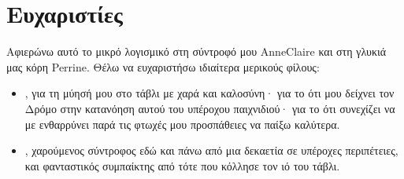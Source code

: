 \documentclass[letterpaper,10pt,greek]{sphinxmanual}
\begin{document}
\chapter{Ευχαριστίες}
\label{\detokenize{index:remerciements}}
\sphinxAtStartPar
Αφιερώνω αυτό το μικρό λογισμικό στη σύντροφό μου Anne\sphinxhyphen{}Claire και στη γλυκιά μας κόρη Perrine. Θέλω να ευχαριστήσω ιδιαίτερα μερικούς φίλους:
\begin{itemize}
\item {} 
\sphinxAtStartPar
{}, για τη μύησή μου στο τάβλι με χαρά και καλοσύνη· για το ότι μου δείχνει τον Δρόμο στην κατανόηση αυτού του υπέροχου παιχνιδιού· για το ότι συνεχίζει να με ενθαρρύνει παρά τις φτωχές μου προσπάθειες να παίξω καλύτερα.

\item {} 
\sphinxAtStartPar
{}, χαρούμενος σύντροφος εδώ και πάνω από μια δεκαετία σε υπέροχες περιπέτειες, και φανταστικός συμπαίκτης από τότε που κόλλησε τον ιό του τάβλι.

\end{itemize}



\renewcommand{\indexname}{Ευρετήριο}
\printindex
\end{document}
